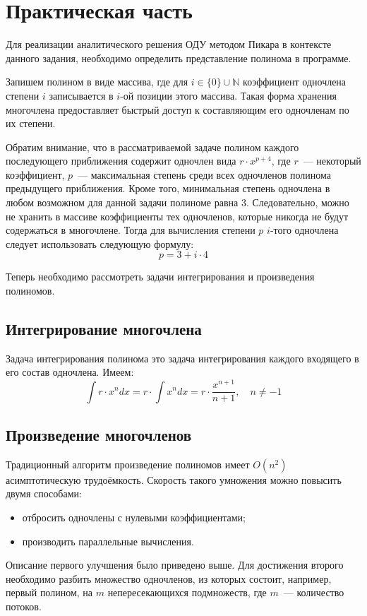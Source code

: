 \chapter{Практическая часть}

Для реализации аналитического решения ОДУ методом Пикара в контексте данного задания, необходимо определить представление полинома в программе.

Запишем полином в виде массива, где для $i \in \big\{0\big\} \cup \mathbb{N}$ коэффициент одночлена степени $i$ записывается в $i$-ой позиции этого массива. Такая форма хранения многочлена предоставляет быстрый доступ к составляющим его одночленам по их степени.

Обратим внимание, что в рассматриваемой задаче полином каждого последующего приближения содержит одночлен вида $r\cdot{}x^{p + 4}$, где $r$~--- некоторый коэффициент, $p$~--- максимальная степень среди всех одночленов полинома предыдущего приближения. Кроме того, минимальная степень одночлена в любом возможном для данной задачи полиноме равна 3. Следовательно, можно не хранить в массиве коэффициенты тех одночленов, которые никогда не будут содержаться в многочлене. Тогда для вычисления степени $p$ $i$-того одночлена следует использовать следующую формулу:
\begin{equation}
    p = 3 + i \cdot 4
\end{equation}

Теперь необходимо рассмотреть задачи интегрирования и произведения полиномов.

\section{Интегрирование многочлена}
Задача интегрирования полинома это задача интегрирования каждого входящего в его состав одночлена. Имеем:
\begin{equation}
    \int{r \cdot x^n dx} = r \cdot \int{x^n dx} = r \cdot \frac{x^{n + 1}}{n + 1},\quad{}n \ne -1
\end{equation}

\section{Произведение многочленов}
Традиционный алгоритм произведение полиномов имеет $O(n^2)$ асимптотическую трудоёмкость. Скорость такого умножения можно повысить двумя способами:
\begin{itemize}
    \item отбросить одночлены с нулевыми коэффициентами;
    \item производить параллельные вычисления.
\end{itemize}
Описание первого улучшения было приведено выше. Для достижения второго необходимо разбить множество одночленов, из которых состоит, например, первый полином, на $m$ непересекающихся подмножеств, где $m$~--- количество потоков.

